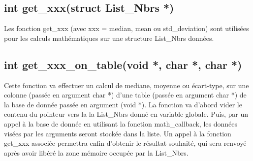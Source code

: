 \subsection*{int get\_xxx(struct List\_Nbrs *)}
Les fonction get\_xxx (avec xxx = median, mean ou std\_deviation) sont utilisées pour les calculs mathématiques sur une structure List\_Nbrs données.
\subsection*{int get\_xxx\_on\_table(void *, char *, char *)}
Cette fonction va effectuer un calcul de mediane, moyenne ou écart-type, sur une colonne (passée en argument char *) d'une table (passée en argument char *) de la base de donnée passée en argument (void *). La fonction va d'abord vider le contenu du pointeur vers la la List\_Nbrs donné en variable globale. Puis, par un appel à la base de donnée en utilisant la fonction math\_callback, les données visées par les arguments seront stockée dans la liste. Un appel à la fonction get\_xxx associée permettra enfin d'obtenir le résultat souhaité, qui sera renvoyé après avoir libéré la zone mémoire occupée par la List\_Nbrs.
